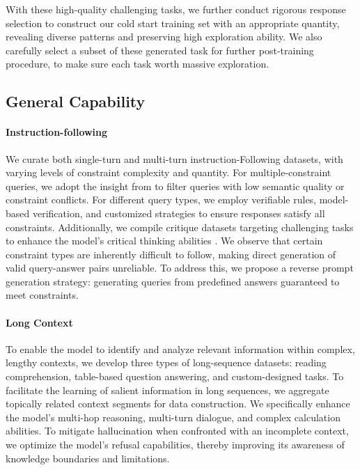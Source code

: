 \documentclass{article}
\begin{document}
With these high-quality challenging tasks, we further conduct rigorous response selection to construct our cold start training set with an appropriate quantity, revealing diverse patterns and preserving high exploration ability. We also carefully select a subset of these generated task for further post-training procedure, to make sure each task worth massive exploration.

\subsection{General Capability}

\paragraph{Instruction-following} 

We curate both single-turn and multi-turn instruction-Following datasets, with varying levels of constraint complexity and quantity. For multiple-constraint queries, we adopt the insight from \citet{ye2025multi} to filter queries with low semantic quality or constraint conflicts. For different query types, we employ verifiable rules, model-based verification, and customized strategies to ensure responses satisfy all constraints. Additionally, we compile critique datasets targeting challenging tasks to enhance the model's critical thinking abilities \citep{Critique_ft}. We observe that certain constraint types are inherently difficult to follow, making direct generation of valid query-answer pairs unreliable. To address this, we propose a reverse prompt generation strategy: generating queries from predefined answers guaranteed to meet constraints. 

\paragraph{Long Context}
To enable the model to identify and analyze relevant information within complex, lengthy contexts, we develop three types of long-sequence datasets: reading comprehension, table-based question answering, and custom-designed tasks. 
To facilitate the learning of salient information in long sequences, we aggregate topically related context segments for data construction.
We specifically enhance the model’s multi-hop reasoning, multi-turn dialogue, and complex calculation abilities. To mitigate hallucination when confronted with an incomplete context, we optimize the model’s refusal capabilities, thereby improving its awareness of knowledge boundaries and limitations.
\end{document}
